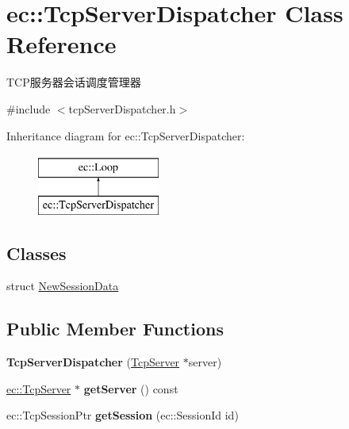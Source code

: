 \hypertarget{classec_1_1TcpServerDispatcher}{\section{ec\-:\-:Tcp\-Server\-Dispatcher Class Reference}
\label{classec_1_1TcpServerDispatcher}
}


T\-C\-P服务器会话调度管理器  




{\ttfamily \#include $<$tcp\-Server\-Dispatcher.\-h$>$}

Inheritance diagram for ec\-:\-:Tcp\-Server\-Dispatcher\-:\begin{figure}[H]
\begin{center}
\leavevmode
\includegraphics[height=2.000000cm]{classec_1_1TcpServerDispatcher}
\end{center}
\end{figure}
\subsection*{Classes}
\begin{DoxyCompactItemize}
\item 
struct \hyperlink{structec_1_1TcpServerDispatcher_1_1NewSessionData}{New\-Session\-Data}
\end{DoxyCompactItemize}
\subsection*{Public Member Functions}
\begin{DoxyCompactItemize}
\item 
\hypertarget{classec_1_1TcpServerDispatcher_a0fcac28c897fdccaabf54ddd1f718caa}{{\bfseries Tcp\-Server\-Dispatcher} (\hyperlink{classec_1_1TcpServer}{Tcp\-Server} $\ast$server)}\label{classec_1_1TcpServerDispatcher_a0fcac28c897fdccaabf54ddd1f718caa}

\item 
\hypertarget{classec_1_1TcpServerDispatcher_a039333f36785f4405a0fac6661a1398a}{\hyperlink{classec_1_1TcpServer}{ec\-::\-Tcp\-Server} $\ast$ {\bfseries get\-Server} () const }\label{classec_1_1TcpServerDispatcher_a039333f36785f4405a0fac6661a1398a}

\item 
\hypertarget{classec_1_1TcpServerDispatcher_acdc755e605191a51778baddf03b425cd}{ec\-::\-Tcp\-Session\-Ptr {\bfseries get\-Session} (ec\-::\-Session\-Id id)}\label{classec_1_1TcpServerDispatcher_acdc755e605191a51778baddf03b425cd}

\end{DoxyCompactItemize}
